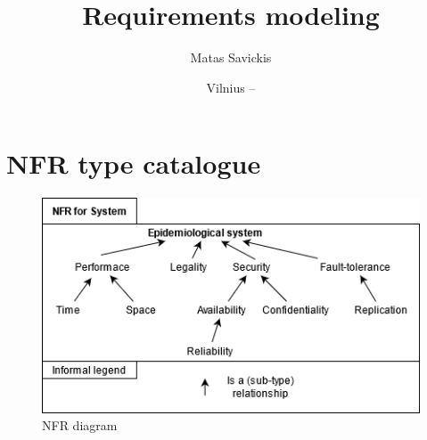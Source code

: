 \documentclass{VUMIFPSkursinis}
\title{Requirements modeling}
\author{Matas Savickis}
\date{Vilnius – \the\year}
\begin{document}
\maketitle

\tableofcontents

\section{NFR type catalogue}

\begin{figure}[htbp]
	\center
	\includegraphics[scale=0.6]{img/1}
	\caption{NFR diagram} %
	\label{img:kurimoProcesas}
\end{figure}
\end{document}
